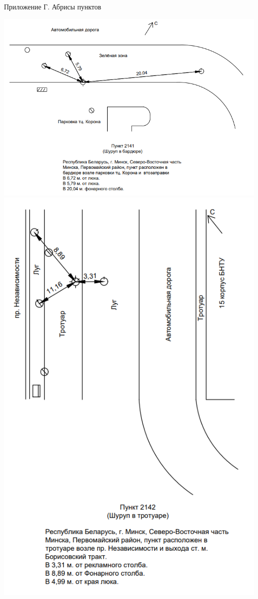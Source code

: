 \documentclass[a4paper]{article}
\begin{document}
\begin{newpage}

    \begin{flushright}
        Приложение Г. Абрисы пунктов
    \end{flushright}
    
    \begin{center}
            \includegraphics[scale=1.2]{abrisy/Абрис 2141.png}
            \includegraphics[scale=1.2]{abrisy/Абрис 2142.png}

\end{center}
\end{newpage}
\end{document}
